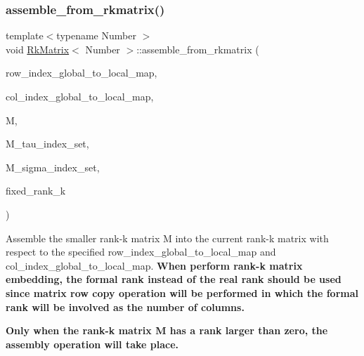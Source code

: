 \mbox{\label{classRkMatrix_a9ff620f9f71181c794e129d71d76da7c}} 
\subsubsection{\texorpdfstring{assemble\+\_\+from\+\_\+rkmatrix()}{assemble\_from\_rkmatrix()}\hspace{0.1cm}{\footnotesize\ttfamily [1/2]}}
{\footnotesize\ttfamily template$<$typename Number $>$ \\
void \hyperlink{classRkMatrix}{Rk\+Matrix}$<$ Number $>$\+::assemble\+\_\+from\+\_\+rkmatrix (\begin{DoxyParamCaption}\item[{const std\+::map$<$ types\+::global\+\_\+dof\+\_\+index, size\+\_\+t $>$ \&}]{row\+\_\+index\+\_\+global\+\_\+to\+\_\+local\+\_\+map,  }\item[{const std\+::map$<$ types\+::global\+\_\+dof\+\_\+index, size\+\_\+t $>$ \&}]{col\+\_\+index\+\_\+global\+\_\+to\+\_\+local\+\_\+map,  }\item[{const \hyperlink{classRkMatrix}{Rk\+Matrix}$<$ Number $>$ \&}]{M,  }\item[{const std\+::vector$<$ types\+::global\+\_\+dof\+\_\+index $>$ \&}]{M\+\_\+tau\+\_\+index\+\_\+set,  }\item[{const std\+::vector$<$ types\+::global\+\_\+dof\+\_\+index $>$ \&}]{M\+\_\+sigma\+\_\+index\+\_\+set,  }\item[{const \hyperlink{classRkMatrix_add060bfc3a4cc77f858c3d6dd58cadd5}{size\+\_\+type}}]{fixed\+\_\+rank\+\_\+k }\end{DoxyParamCaption})}

Assemble the smaller rank-\/k matrix {\ttfamily M} into the current rank-\/k matrix with respect to the specified {\ttfamily row\+\_\+index\+\_\+global\+\_\+to\+\_\+local\+\_\+map} and {\ttfamily col\+\_\+index\+\_\+global\+\_\+to\+\_\+local\+\_\+map}. {\bfseries When perform rank-\/k matrix embedding, the formal rank instead of the real rank should be used since matrix row copy operation will be performed in which the formal rank will be involved as the number of columns.}

{\bfseries Only when the rank-\/k matrix {\ttfamily M} has a rank larger than zero, the assembly operation will take place.}

